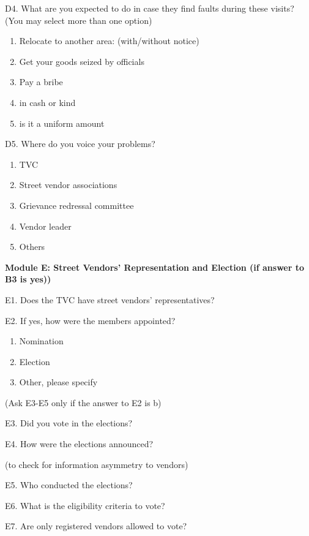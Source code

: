 \documentclass[a4paper, 12pt, twoside]{article}
\begin{document}
{{\begin{mdframed}[backgroundcolor=gray!20]
D4. What are you expected to do in case they find faults during these visits? (You may select more than one option)
\begin{enumerate}[nosep]
\item Relocate to another area: (with/without notice)
\item Get your goods seized by officials
\item Pay a bribe
\item in cash or kind
\item is it a uniform amount
\end{enumerate}

D5. Where do you voice your problems?
\begin{enumerate}[nosep]
\item TVC
\item Street vendor associations
\item Grievance redressal committee
\item Vendor leader
\item Others
\end{enumerate}

\textbf{Module E: Street Vendors’ Representation and Election (if answer to B3 is yes))}

E1. Does the TVC have street vendors’ representatives?

E2. If yes, how were the members appointed?
\begin{enumerate}[nosep]
\item Nomination
\item Election
\item Other, please specify
\end{enumerate}

(Ask E3-E5 only if the answer to E2 is b)

E3. Did you vote in the elections?

E4. How were the elections announced?

       (to check for information asymmetry to vendors)

E5. Who conducted the elections?

E6. What is the eligibility criteria to vote?

E7. Are only registered vendors allowed to vote?

\end{mdframed}

\newpage
}}
\end{document}
